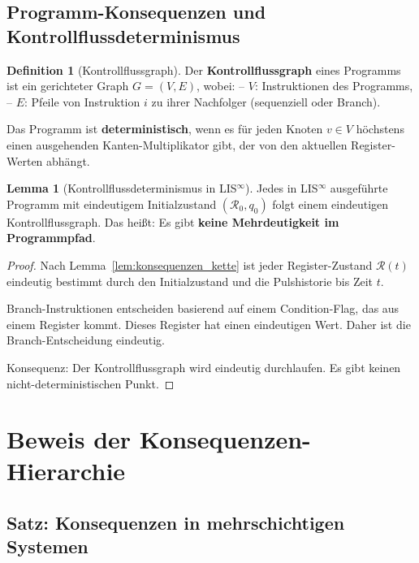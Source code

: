 \documentclass[a4paper,12pt]{article}
\theoremstyle{definition}
\newtheorem{definition}{Definition}
\newtheorem{lemma}{Lemma}
\begin{document}
\subsection{Programm-Konsequenzen und Kontrollflussdeterminismus}

\begin{definition}[Kontrollflussgraph]
	Der \textbf{Kontrollflussgraph} eines Programms ist ein gerichteter Graph $G = (V, E)$, wobei:
	-- $V$: Instruktionen des Programms,
	-- $E$: Pfeile von Instruktion $i$ zu ihrer Nachfolger (sequenziell oder Branch).
	
	Das Programm ist \textbf{deterministisch}, wenn es für jeden Knoten $v \in V$ höchstens einen ausgehenden Kanten-Multiplikator gibt, der von den aktuellen Register-Werten abhängt.
\end{definition}

\begin{lemma}[Kontrollflussdeterminismus in LIS$^{\infty}$]
	\label{lem:ctrl_determinism}
	Jedes in LIS$^{\infty}$ ausgeführte Programm mit eindeutigem Initialzustand $(\mathcal{R}_0, q_0)$ folgt einem eindeutigen Kontrollflussgraph. Das heißt: Es gibt \textbf{keine Mehrdeutigkeit im Programmpfad}.
\end{lemma}

\begin{proof}
	Nach Lemma~\ref{lem:konsequenzen_kette} ist jeder Register-Zustand $\mathcal{R}(t)$ eindeutig bestimmt durch den Initialzustand und die Pulshistorie bis Zeit $t$. 
	
	Branch-Instruktionen entscheiden basierend auf einem Condition-Flag, das aus einem Register kommt. Dieses Register hat einen eindeutigen Wert. Daher ist die Branch-Entscheidung eindeutig.
	
	Konsequenz: Der Kontrollflussgraph wird eindeutig durchlaufen. Es gibt keinen nicht-deterministischen Punkt.
\end{proof}

\section{Beweis der Konsequenzen-Hierarchie}

\subsection{Satz: Konsequenzen in mehrschichtigen Systemen}
\end{document}
